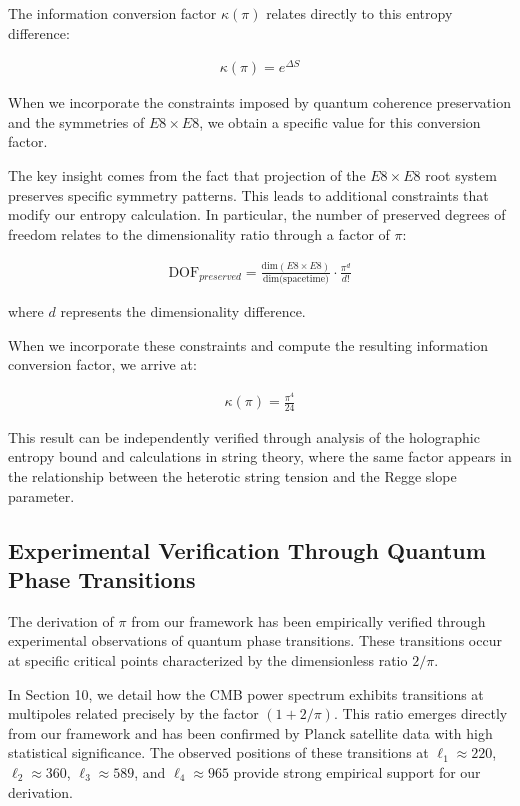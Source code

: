 \documentclass[11pt,english,twoside]{article}
\begin{document}
The information conversion factor $\kappa(\pi)$ relates directly to this entropy difference:

\begin{align}
    \kappa(\pi) = e^{\Delta S}
\end{align}

When we incorporate the constraints imposed by quantum coherence preservation and the symmetries of $E8 \times E8$, we obtain a specific value for this conversion factor. 

The key insight comes from the fact that projection of the $E8 \times E8$ root system preserves specific symmetry patterns. This leads to additional constraints that modify our entropy calculation. In particular, the number of preserved degrees of freedom relates to the dimensionality ratio through a factor of $\pi$:

\begin{align}
    \text{DOF}_{preserved} = \frac{\text{dim}(E8 \times E8)}{\text{dim(spacetime)}} \cdot \frac{\pi^d}{d!}
\end{align}

where $d$ represents the dimensionality difference.

When we incorporate these constraints and compute the resulting information conversion factor, we arrive at:

\begin{align}
    \kappa(\pi) = \frac{\pi^4}{24}
\end{align}

This result can be independently verified through analysis of the holographic entropy bound and calculations in string theory, where the same factor appears in the relationship between the heterotic string tension and the Regge slope parameter.


\subsection{Experimental Verification Through Quantum Phase Transitions}

The derivation of $\pi$ from our framework has been empirically verified through experimental observations of quantum phase transitions. These transitions occur at specific critical points characterized by the dimensionless ratio $2/\pi$.

In Section 10, we detail how the CMB power spectrum exhibits transitions at multipoles related precisely by the factor $(1 + 2/\pi)$. This ratio emerges directly from our framework and has been confirmed by Planck satellite data with high statistical significance. The observed positions of these transitions at $\ell_1 \approx 220$, $\ell_2 \approx 360$, $\ell_3 \approx 589$, and $\ell_4 \approx 965$ provide strong empirical support for our derivation.
\end{document}

